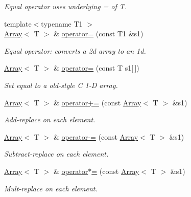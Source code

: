 \begin{DoxyCompactItemize}
\begin{DoxyCompactList}\small\item\em Equal operator uses underlying = of T. \end{DoxyCompactList}\item 
{\footnotesize template$<$typename T1 $>$ }\\\mbox{\hyperlink{classXMLArray_1_1Array}{Array}}$<$ T $>$ \& \mbox{\hyperlink{classXMLArray_1_1Array_a3051ecb95c6d07f9ad80e72a2fd50c61}{operator=}} (const T1 \&s1)
\begin{DoxyCompactList}\small\item\em Equal operator\+: converts a 2d array to an 1d. \end{DoxyCompactList}\item 
\mbox{\hyperlink{classXMLArray_1_1Array}{Array}}$<$ T $>$ \& \mbox{\hyperlink{classXMLArray_1_1Array_a73e85fb91d2c802400fa356bc3ce77e1}{operator=}} (const T s1\mbox{[}$\,$\mbox{]})
\begin{DoxyCompactList}\small\item\em Set equal to a old-\/style C 1-\/D array. \end{DoxyCompactList}\item 
\mbox{\hyperlink{classXMLArray_1_1Array}{Array}}$<$ T $>$ \& \mbox{\hyperlink{classXMLArray_1_1Array_ab8a6046aa7dbc0b3c43e4479b1eaf004}{operator+=}} (const \mbox{\hyperlink{classXMLArray_1_1Array}{Array}}$<$ T $>$ \&s1)
\begin{DoxyCompactList}\small\item\em Add-\/replace on each element. \end{DoxyCompactList}\item 
\mbox{\hyperlink{classXMLArray_1_1Array}{Array}}$<$ T $>$ \& \mbox{\hyperlink{classXMLArray_1_1Array_aa92c6d59ed6a656c3004db85bd67c192}{operator-\/=}} (const \mbox{\hyperlink{classXMLArray_1_1Array}{Array}}$<$ T $>$ \&s1)
\begin{DoxyCompactList}\small\item\em Subtract-\/replace on each element. \end{DoxyCompactList}\item 
\mbox{\hyperlink{classXMLArray_1_1Array}{Array}}$<$ T $>$ \& \mbox{\hyperlink{classXMLArray_1_1Array_a866bd17aae2f3d1935f015a936ce9424}{operator$\ast$=}} (const \mbox{\hyperlink{classXMLArray_1_1Array}{Array}}$<$ T $>$ \&s1)
\begin{DoxyCompactList}\small\item\em Mult-\/replace on each element. \end{DoxyCompactList}\item 

\end{DoxyCompactItemize}
